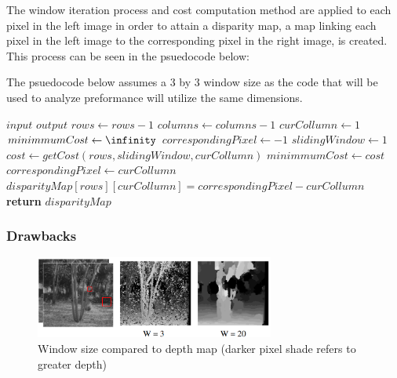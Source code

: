 \documentclass[11pt]{scrartcl}
\begin{document}
The window iteration process and cost computation method are applied to each pixel in the 
left image in order to attain a disparity map, a map linking each pixel in the left image 
to the corresponding pixel in the right image, is created. This process can be seen in the 
psuedocode below:
\begin{remark}
    The psuedocode below assumes a 3 by 3 window size as the code that will 
    be used to analyze preformance will utilize the same dimensions. 
\end{remark}
\begin{algorithm}[!htb]
    \algrenewcommand{}
    \algrenewcommand{}
    \caption{}
    \label{alg:}
    \begin{algorithmic}[1]
        \Require $input$
        \Ensure $output$ 
        \State $rows \gets rows-1$
        \State $columns \gets columns-1$
            \State $curCollumn \gets 1$
                \State $minimmumCost \gets \infinity$
                \State $correspondingPixel \gets -1$
                \State $slidingWindow \gets 1$
                      \State $cost \gets getCost(rows, slidingWindow, curCollumn)$
                         \State $minimmumCost \gets cost$
                         \State $correspondingPixel \gets curCollumn$
                      \EndIf
                \EndWhile
            \EndWhile 
            \State $disparityMap[rows][curCollumn] = correspondingPixel - curCollumn$
        \EndWhile
        \State \textbf{return} $disparityMap$
    \end{algorithmic}
\end{algorithm}

\subsubsection{Drawbacks}
\begin{figure}
  \includegraphics[width=0.7\textwidth]{winsize.png}
    \caption{\label{fig:frog1} Window size compared to depth map (darker pixel shade refers to greater depth)}

\end{figure}
\end{document}

